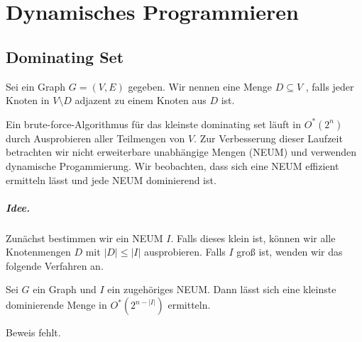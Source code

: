 \chapter{Dynamisches Programmieren}

\section{Dominating Set}

  Sei ein Graph \(G = (V,E)\) gegeben. Wir nennen eine Menge \(D \subseteq V\) , falls jeder Knoten in \(V \setminus D\) adjazent zu einem Knoten aus \(D\) ist.

  Ein brute-force-Algorithmus für das kleinste dominating set läuft in \(O^*(2^n)\) durch Ausprobieren aller Teilmengen von \(V\). Zur Verbesserung dieser Laufzeit betrachten wir nicht erweiterbare unabhängige Mengen (NEUM) und verwenden dynamische Progammierung. Wir beobachten, dass sich eine NEUM effizient ermitteln lässt und jede NEUM dominierend ist.

  \paragraph{Idee.} Zunächst bestimmen wir ein NEUM \(I\). Falls dieses klein ist, können wir alle Knotenmengen \(D\) mit \(|D| \leq |I|\) ausprobieren. Falls \(I\) groß ist, wenden wir das folgende Verfahren an.

  \begin{lemma}
    Sei \(G\) ein Graph und \(I\) ein zugehöriges NEUM. Dann lässt sich eine kleinste dominierende Menge in \(O^*(2^{n-|I|})\) ermitteln.
  \end{lemma}

  Beweis fehlt.


